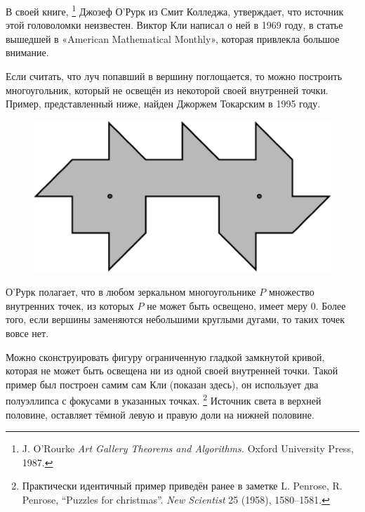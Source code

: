 В своей книге,%
\footnote{J. O'Rourke \emph{Art Gallery Theorems and Algorithms.} Oxford University Press, 1987.}
Джозеф О’Рурк %
из Смит Колледжа, утверждает, что источник этой головоломки неизвестен.
Виктор Кли написал о ней в 1969 году, в статье вышедшей в «American Mathe\-ma\-tical Monthly», которая привлекла большое внимание. 

Если считать, что луч попавший в вершину поглощается, то можно построить многоугольник, который не освещён из некоторой своей внутренней точки.
Пример, представленный ниже, найден Джоржем Токарским в 1995 году.

\begin{figure}[h!]
\centering
\includegraphics[scale=0.5]{Figs/UnsolvedPuzzles/vision}
\end{figure} 

О’Рурк полагает, что в любом зеркальном многоугольнике $P$ множество внутренних точек, из которых $P$ не может быть освещено, имеет меру 0.
Более того, если вершины заменяются небольшими круглыми дугами, то таких точек вовсе нет.

Можно сконструировать фигуру ограниченную гладкой замкнутой кривой, которая не может быть освещена ни из одной своей внутренней точки. 
Такой пример был построен самим сам Кли (показан здесь), он использует два полуэллипса с фокусами в указанных точках.%
\footnote{Практически идентичный пример приведён ранее в заметке L. Penrose, R. Penrose, ``Puzzles for christmas''. \emph{New Scientist} 25 (1958), 1580--1581.}
Источник света в верхней половине, оставляет тёмной левую и правую доли на нижней половине.

